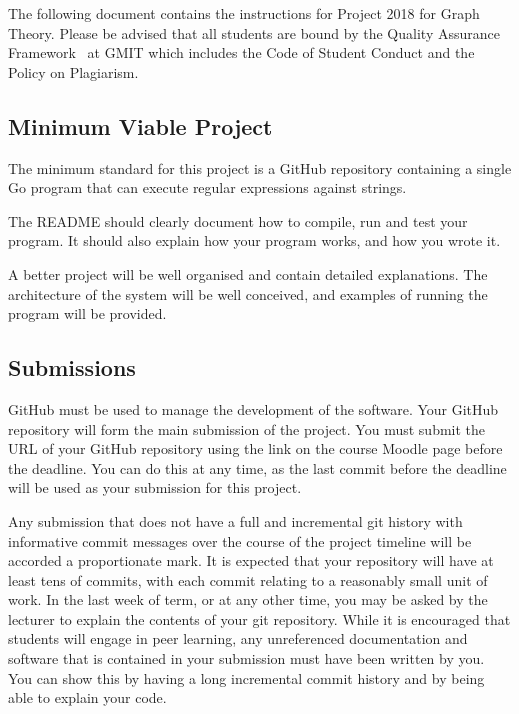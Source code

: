 \documentclass[12pt, a4paper]{article}
\title{\projectname}
\author{\modulename}
\date{Due: \duedate}
\newcommand{\modulename}{Graph Theory}
\newcommand{\projectyear}{2018}
\newcommand{\projectname}{Project \projectyear}
\begin{document}
\maketitle

\noindent
The following document contains the instructions for \projectname{} for \modulename{}.
Please be advised that all students are bound by the Quality Assurance Framework~\cite{gmitqaf} at GMIT which includes the Code of Student Conduct and the Policy on Plagiarism.


\subsection*{Minimum Viable Project}
The minimum standard for this project is a GitHub repository containing a single Go program that can execute regular expressions against strings.

The README should clearly document how to compile, run and test your program.
It should also explain how your program works, and how you wrote it.

A better project will be well organised and contain detailed explanations.
The architecture of the system will be well conceived, and examples of running the program will be provided.


\subsection*{Submissions}
GitHub must be used to manage the development of the software.
Your GitHub repository will form the main submission of the project.
You must submit the URL of your GitHub repository using the link on the course Moodle page before the deadline.
You can do this at any time, as the last commit before the deadline will be used as your submission for this project.

Any submission that does not have a full and incremental git history with informative commit messages over the course of the project timeline will be accorded a proportionate mark.
It is expected that your repository will have at least tens of commits, with each commit relating to a reasonably small unit of work.
In the last week of term, or at any other time, you may be asked by the lecturer to explain the contents of your git repository.
While it is encouraged that students will engage in peer learning, any unreferenced documentation and software that is contained in your submission must have been written by you.
You can show this by having a long incremental commit history and by being able to explain your code.
\end{document}

